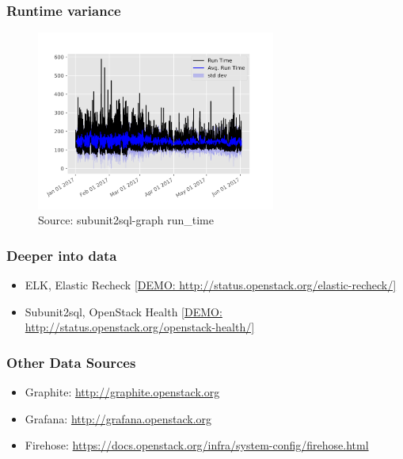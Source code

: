 \documentclass[aspectratio=169,11pt,hyperref={colorlinks=true}]{beamer}
\begin{document}
\begin{frame}
    \frametitle{Runtime variance}
    \begin{figure}
    \begin{center}
    	\includegraphics[width=0.7\textwidth]{runtime_variance.png}
         \caption{Source: subunit2sql-graph run\_time}
    \end{center}
    \end{figure}
\end{frame}


\begin{frame}
    \frametitle{Deeper into data}
    \begin{itemize}
        \item{ELK, Elastic Recheck \href{http://status.openstack.org/elastic-recheck/}{[DEMO: http://status.openstack.org/elastic-recheck/]}}
        \item{Subunit2sql, OpenStack Health \href{http://status.openstack.org/openstack-health/\#/}{[DEMO: http://status.openstack.org/openstack-health/]}}
    \end{itemize}
\end{frame}


\begin{frame}
    \frametitle{Other Data Sources}
    \begin{itemize}
        \item{Graphite: \href{http://graphite.openstack.org}{http://graphite.openstack.org}}
        \item{Grafana: \href{http://grafana.openstack.org}{http://grafana.openstack.org}}
        \item{Firehose: \href{https://docs.openstack.org/infra/system-config/firehose.html}{https://docs.openstack.org/infra/system-config/firehose.html}}
    \end{itemize}
\end{frame}
\end{document}
